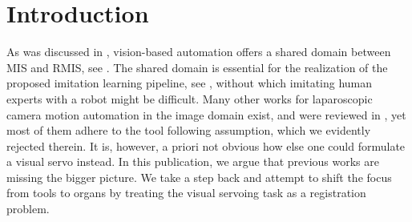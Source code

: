 


\section{Introduction}
\label{c2:sec:introduction}
As was discussed in , vision-based automation offers a shared domain between MIS and RMIS, see . The shared domain is essential for the realization of the proposed imitation learning pipeline, see , without which imitating human experts with a robot might be difficult. Many other works for laparoscopic camera motion automation in the image domain exist, and were reviewed in , yet most of them adhere to the tool following assumption, which we evidently rejected therein. It is, however, a priori not obvious how else one could formulate a visual servo instead. In this publication, we argue that previous works are missing the bigger picture. We take a step back and attempt to shift the focus from tools to organs by treating the visual servoing task as a registration problem.

